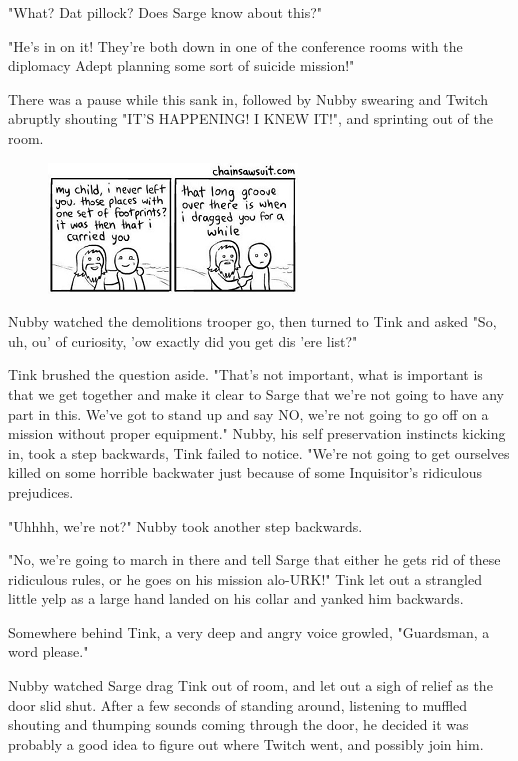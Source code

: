 "What? 
Dat pillock? 
Does Sarge know about this?"

"He's in on it! 
They're both down in one of the conference rooms with the diplomacy Adept planning some sort of suicide mission!"

There was a pause while this sank in, followed by Nubby swearing and Twitch abruptly shouting "IT'S HAPPENING! 
I KNEW IT!", and sprinting out of the room.

\begin{figure}
	\begin{center}
		\includegraphics[width=\figwidth]{pics/17/3.png}
	\end{center}
\end{figure}
Nubby watched the demolitions trooper go, then turned to Tink and asked "So, uh, ou' of curiosity, 'ow exactly did you get dis 'ere list?"

Tink brushed the question aside. 
"That's not important, what is important is that we get together and make it clear to Sarge that we're not going to have any part in this. 
We've got to stand up and say NO, we're not going to go off on a mission without proper equipment." Nubby, his self preservation instincts kicking in, took a step backwards, Tink failed to notice. 
"We're not going to get ourselves killed on some horrible backwater just because of some Inquisitor's ridiculous prejudices.

"Uhhhh, we're not?" Nubby took another step backwards.

"No, we're going to march in there and tell Sarge that either he gets rid of these ridiculous rules, or he goes on his mission alo-URK!" Tink let out a strangled little yelp as a large hand landed on his collar and yanked him backwards.

Somewhere behind Tink, a very deep and angry voice growled, "Guardsman, a word please."

Nubby watched Sarge drag Tink out of room, and let out a sigh of relief as the door slid shut. 
After a few seconds of standing around, listening to muffled shouting and thumping sounds coming through the door, he decided it was probably a good idea to figure out where Twitch went, and possibly join him.

